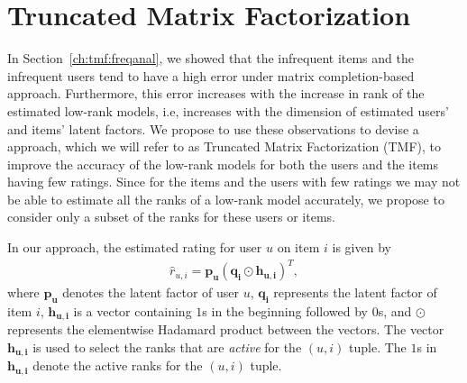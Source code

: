 
\section{Truncated Matrix Factorization}\label{ch:tmf:drop_method} 
In Section~\ref{ch:tmf:freqanal}, we showed that the infrequent items and the infrequent users tend to have a high error under matrix completion-based approach.
Furthermore, this error increases with the increase in rank of the estimated
low-rank models, i.e, increases with the dimension of estimated users' and items' latent factors.  
We propose to use these observations to devise a approach, which we will
refer to as Truncated Matrix Factorization (TMF), to improve the
accuracy of the low-rank models for both the users and the items having few ratings. 
Since for the items and the users with few ratings we may not be able to estimate 
all the ranks of a low-rank model accurately, we propose to consider only a 
subset of the ranks for these users or items.

In our approach, the estimated rating for user $u$ on item $i$ is given by
\begin{equation} \label{mf_drop_est_eq} 
  \begin{split}
  \hat{r}_{u,i} = \bm{p_u}(\bm{q_i}\odot\bm{h_{u,i}})^T,
  \end{split}
\end{equation}
where $\bm{p_u}$ denotes the latent factor of user $u$, $\bm{q_i}$ represents the
latent factor of item $i$,  $\bm{h_{u,i}}$ is a vector containing $1$s in the
beginning followed by $0$s, and 
$\odot$ represents the elementwise Hadamard product between the vectors.
The vector $\bm{h_{u,i}}$ is used to select the ranks that are \emph{active} for the
$(u,i)$ tuple. The $1$s in $\bm{h_{u,i}}$ denote the active ranks for the
$(u,i)$ tuple.

